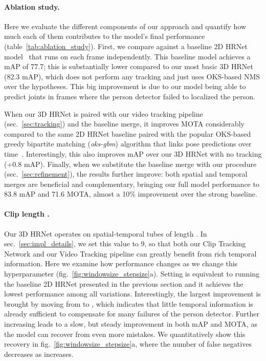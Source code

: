 \documentclass[10pt,twocolumn,letterpaper]{article}
\begin{document}
\paragraph{Ablation study.} Here we evaluate the different components of our approach and quantify how much each of them contributes to the model's final performance (table~\ref{tab:ablation_study}). First, we compare against a baseline 2D HRNet model~\cite{sun2019deep} that runs on each frame independently. This baseline model achieves a mAP of 77.7; this is substantially lower compared to our most basic 3D HRNet (82.3 mAP), which does not perform any tracking and just uses OKS-based NMS over the hypotheses. This big improvement is due to our model being able to predict joints in frames where the person detector failed to localized the person. 

When our 3D HRNet is paired with our video tracking pipeline (sec.~\ref{sec:tracking}) and the baseline merge, it improves MOTA considerably compared to the same 2D HRNet baseline paired with the popular OKS-based greedy bipartite matching ({\it oks-gbm}) algorithm that links pose predictions over time~\cite{girdhar2018detecttrack,xiao2018simple}. Interestingly, this also improves mAP over our 3D HRNet with no tracking (+0.8 mAP).
Finally, when we substitute the baseline merge with our procedure (sec.~\ref{sec:refinement}), the results further improve: both spatial and temporal merges are beneficial and complementary, bringing our full model performance to 83.8 mAP and 71.6 MOTA, almost a 10\% improvement over the strong baseline.

 \vspace{-3mm}
\paragraph{Clip length .}
Our 3D HRNet operates on spatial-temporal tubes of length . In sec.~\ref{sec:impl_details}, we set this value to 9, so that both our Clip Tracking Network and our Video Tracking pipeline can greatly benefit from rich temporal information. Here we examine how performance changes as we change this hyperparameter (fig.~\ref{fig:windowsize_stepsize}{\color{red}a}). Setting  is equivalent to running the baseline 2D HRNet presented in the previous section and it achieves the lowest performance among all variations.
Interestingly, the largest improvement is brought by moving from  to , which indicates that little temporal information is already sufficient to compensate for many failures of the person detector. 
Further increasing  leads to a slow, but steady improvement in both mAP and MOTA, as the model can recover from even more mistakes. We quantitatively show this recovery in fig.~\ref{fig:windowsize_stepsize}{\color{red}a}, where the number of false negatives decreases as  increases. 
\end{document}
